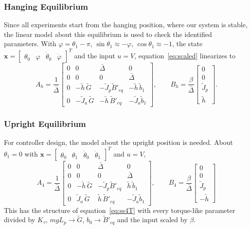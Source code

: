 \documentclass[a4paper,11pt]{article}
\begin{document}
\subsubsection{Hanging Equilibrium}
Since all experiments start from the hanging position, where our system is stable, the linear model about this equilibrium is used to check the identified parameters. With $\varphi = \theta_1 - \pi$, $\sin\theta_1 \approx -\varphi$, $\cos\theta_1 \approx -1$, the state $\mathbf{x} = \begin{bmatrix} \theta_0 & \varphi & \dot\theta_0 & \dot\varphi \end{bmatrix}^T$ and the input $u = V$, equation~\ref{eq:scaled} linearizes to
\begin{equation}
  A_h = \frac{1}{\bar\Delta}\begin{bmatrix}
  0 & 0 & \bar\Delta & 0\\
  0 & 0 & 0 & \bar\Delta\\
  0 & -\tilde h\, \tilde G & -\tilde J_p \tilde B'_{eq} & -\tilde h\, \tilde b_1\\
  0 & -\tilde J_a\, \tilde G & -\tilde h\, \tilde B'_{eq} & -\tilde J_a \tilde b_1
  \end{bmatrix},
  \qquad
  B_h = \frac{\beta}{\bar\Delta}\begin{bmatrix} 0 \\ 0 \\ \tilde J_p \\ \tilde h \end{bmatrix}.
  \label{eq:ss_hang}
\end{equation}

\subsubsection{Upright Equilibrium}
For controller design, the model about the upright position is needed. About $\theta_1 = 0$ with $\mathbf{x} = \begin{bmatrix} \theta_0 & \theta_1 & \dot\theta_0 & \dot\theta_1 \end{bmatrix}^T$ and $u = V$,
\begin{equation}
\boxed{
  A_4 = \frac{1}{\bar\Delta}\begin{bmatrix}
  0 & 0 & \bar\Delta & 0\\
  0 & 0 & 0 & \bar\Delta\\
  0 & -\tilde h\, \tilde G & -\tilde J_p \tilde B'_{eq} & \tilde h\, \tilde b_1\\
  0 & \tilde J_a\, \tilde G & \tilde h\, \tilde B'_{eq} & -\tilde J_a \tilde b_1
  \end{bmatrix},
  \qquad
  B_4 = \frac{\beta}{\bar\Delta}\begin{bmatrix} 0 \\ 0 \\ \tilde J_p \\ -\tilde h \end{bmatrix}
}
\label{eq:ss_up}
\end{equation}
This has the structure of equation~\ref{eq:ss4T} with every torque-like parameter divided by $K_\tau$, $m g L_p \to \tilde G$, $b_0 \to \tilde B'_{eq}$ and the input scaled by $\beta$.
\end{document}
